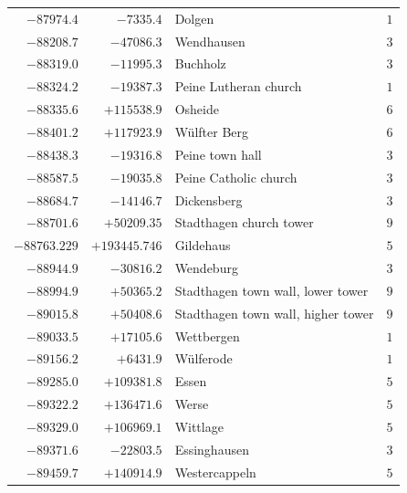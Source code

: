 \begin{center}
\begin{tabular}{r|r|p{170pt}|r}
\(-87974.4\)&\(-7335.4\)&Dolgen&\(1\)\\
\(-88208.7\)&\(-47086.3\)&Wendhausen&\(3\)\\
\(-88319.0\)&\(-11995.3\)&Buchholz&\(3\)\\
\(-88324.2\)&\(-19387.3\)&Peine Lutheran church&\(1\)\\
\(-88335.6\)&\(+115538.9\)&Osheide&\(6\)\\
\(-88401.2\)&\(+117923.9\)&Wülfter Berg&\(6\)\\
\(-88438.3\)&\(-19316.8\)&Peine town hall&\(3\)\\
\(-88587.5\)&\(-19035.8\)&Peine Catholic church&\(3\)\\
\(-88684.7\)&\(-14146.7\)&Dickensberg&\(3\)\\
\(-88701.6\)&\(+50209.35\)&Stadthagen church tower&\(9\)\\
\(-88763.229\)&\(+193445.746\)&Gildehaus&\(5\)\\
\(-88944.9\)&\(-30816.2\)&Wendeburg&\(3\)\\
\(-88994.9\)&\(+50365.2\)&Stadthagen town wall, lower tower&\(9\)\\
\(-89015.8\)&\(+50408.6\)&Stadthagen town wall, higher tower&\(9\)\\
\(-89033.5\)&\(+17105.6\)&Wettbergen&\(1\)\\
\(-89156.2\)&\(+6431.9\)&Wülferode&\(1\)\\
\(-89285.0\)&\(+109381.8\)&Essen&\(5\)\\
\(-89322.2\)&\(+136471.6\)&Werse&\(5\)\\
\(-89329.0\)&\(+106969.1\)&Wittlage&\(5\)\\
\(-89371.6\)&\(-22803.5\)&Essinghausen&\(3\)\\
\(-89459.7\)&\(+140914.9\)&Westercappeln&\(5\)\\
\hline\end{tabular}\endgroup\end{center}
